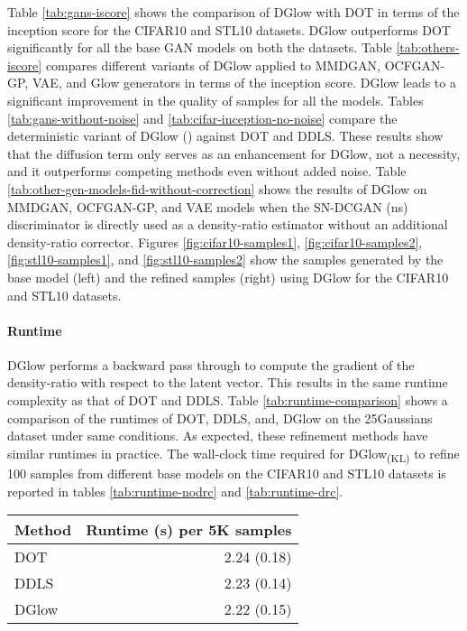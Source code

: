 \documentclass{article} \usepackage{iclr2021_conference,times}
\newcommand{\ourmethod}{\textsc{DG}low}
\begin{document}
Table \ref{tab:gans-iscore} shows the comparison of \ourmethod{} with DOT in terms of the inception score for the CIFAR10 and STL10 datasets. \ourmethod{} outperforms DOT significantly for all the base GAN models on both the datasets. Table \ref{tab:others-iscore} compares different variants of \ourmethod{} applied to MMDGAN, OCFGAN-GP, VAE, and Glow generators in terms of the inception score. \ourmethod{} leads to a significant improvement in the quality of samples for all the models. Tables \ref{tab:gans-without-noise} and \ref{tab:cifar-inception-no-noise} compare the deterministic variant of \ourmethod{} () against DOT and DDLS. These results show that the diffusion term only serves as an enhancement for \ourmethod{}, not a necessity, and it outperforms competing methods even without added noise. Table \ref{tab:other-gen-models-fid-without-correction} shows the results of \ourmethod{} on MMDGAN, OCFGAN-GP, and VAE models when the SN-DCGAN (ns) discriminator is directly used as a density-ratio estimator without an additional density-ratio corrector. Figures \ref{fig:cifar10-samples1}, \ref{fig:cifar10-samples2}, \ref{fig:stl10-samples1}, and \ref{fig:stl10-samples2} show the samples generated by the base model (left) and the refined samples (right) using \ourmethod{} for the CIFAR10 and STL10 datasets.

\paragraph{Runtime}

\ourmethod{} performs a backward pass through  to compute the gradient of the density-ratio with respect to the latent vector. This results in the same runtime complexity as that of DOT and DDLS. Table \ref{tab:runtime-comparison} shows a comparison of the runtimes of DOT, DDLS, and, \ourmethod{} on the 25Gaussians dataset under same conditions. As expected, these refinement methods have similar runtimes in practice. The wall-clock time required for \ourmethod{}\textsubscript{(KL)} to refine 100 samples from different base models on the CIFAR10 and STL10 datasets is reported in tables \ref{tab:runtime-nodrc} and \ref{tab:runtime-drc}. 

 \begin{table*}
 \centering
 	\caption{\small Runtime comparison of DOT, DDLS, and \ourmethod{}\textsubscript{(KL)} on the 25Gaussians dataset. The runtime is averaged over 100 runs with standard deviation reported in parentheses.}
 	\label{tab:runtime-comparison}
	\begin{tabular}{lr} 
	\toprule
	Method & Runtime (s) per 5K samples\\
	\midrule
	DOT & 2.24 (0.18)\\
	DDLS & 2.23 (0.14) \\
	\ourmethod{} & 2.22 (0.15)\\
	\bottomrule
	\end{tabular}	
 \end{table*}
  
\end{document}

